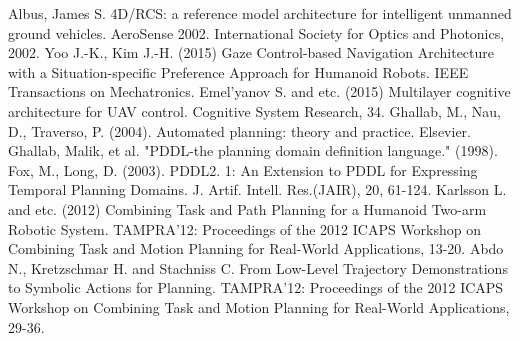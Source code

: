\documentclass[runningheads,a4paper]{llncs}
\begin{document}
\begin{thebibliography}{4}

 Albus, James S. 4D/RCS: a reference model architecture for intelligent unmanned ground vehicles. AeroSense 2002. International Society for Optics and Photonics, 2002.
 Yoo J.-K., Kim J.-H. (2015) Gaze Control-based Navigation Architecture with a Situation-specific Preference Approach for Humanoid Robots. IEEE Transactions on Mechatronics.
 Emel’yanov S. and etc. (2015) Multilayer cognitive architecture for UAV control. Cognitive System Research, 34.
 Ghallab, M., Nau, D., Traverso, P. (2004). Automated planning: theory and practice. Elsevier.
 Ghallab, Malik, et al. "PDDL-the planning domain definition language." (1998).
 Fox, M., Long, D. (2003). PDDL2. 1: An Extension to PDDL for Expressing Temporal Planning Domains. J. Artif. Intell. Res.(JAIR), 20, 61-124.
 Karlsson L. and etc. (2012) Combining Task and Path Planning for a Humanoid Two-arm Robotic System. TAMPRA'12: Proceedings of the 2012 ICAPS Workshop on Combining Task and Motion Planning for Real-World Applications, 13-20.
 Abdo N., Kretzschmar H. and Stachniss C. From Low-Level Trajectory Demonstrations to Symbolic Actions for Planning. TAMPRA'12: Proceedings of the 2012 ICAPS Workshop on Combining Task and Motion Planning for Real-World Applications, 29-36.


\end{thebibliography}
\end{document}
